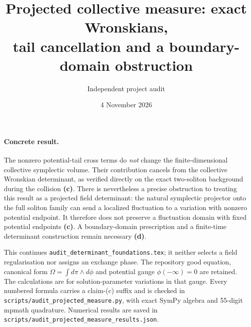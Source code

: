\documentclass[11pt]{article}
\title{Projected collective measure: exact Wronskians,\\tail cancellation and a boundary-domain obstruction}
\author{Independent project audit}
\date{4 November 2026}
\newcommand{\Lc}{\textbf{(c)}}
\newcommand{\Ld}{\textbf{(d)}}
\begin{document}
\maketitle

\paragraph{Concrete result.}
The nonzero potential-tail cross terms do \emph{not} change the finite-dimensional
collective symplectic volume. Their contribution cancels from the collective Wronskian determinant, as
verified directly on the exact two-soliton background during the collision
\Lc. There is nevertheless a precise obstruction to treating this result as a
projected field determinant: the natural symplectic projector onto the full
soliton family can send a localized fluctuation to a variation with nonzero
potential endpoint. It therefore does not preserve a fluctuation domain with
fixed potential endpoints \Lc. A boundary-domain prescription and a
finite-time determinant construction remain necessary \Ld.

This continues \texttt{audit\_determinant\_foundations.tex}; it neither selects
a field regularisation nor assigns an exchange phase. The repository good
equation, canonical form $\Omega=\int d\pi\wedge d\phi$ and potential gauge
$\phi(-\infty)=0$ are retained. The calculations are for solution-parameter
variations in that gauge. Every numbered formula carries a claim-(c) suffix and is checked in
\texttt{scripts/audit\_\allowbreak projected\_\allowbreak measure.py}, with exact SymPy algebra and
55-digit mpmath quadrature. Numerical results are saved in
\texttt{scripts/audit\_\allowbreak projected\_\allowbreak measure\_\allowbreak results.json}.
\end{document}
